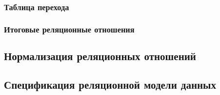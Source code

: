 \documentclass[10pt, a4paper, titlepage]{article}
\begin{document}
{    %
    \newcommand\krTseleyVvozaIVivoza{Классификатор особых условий ввоза и вывоза (\pk{Код особого условия}, Наименование осбого условия ввоза или вывоза)}
    
    \newcommand\krTseleyVvozaIVivozaPK{Код особого условия}
    \newcommand\krTseleyVvozaIVivozaFK{}
    
    
    \subsubsection{Таблица перехода}
    
    
    
    
    
    
    \subsubsection{Итоговые реляционные отношения}
    
    
    
    
}

\subsection{Нормализация реляционных отношений}



\subsection{Спецификация реляционной модели данных}
\end{document}
